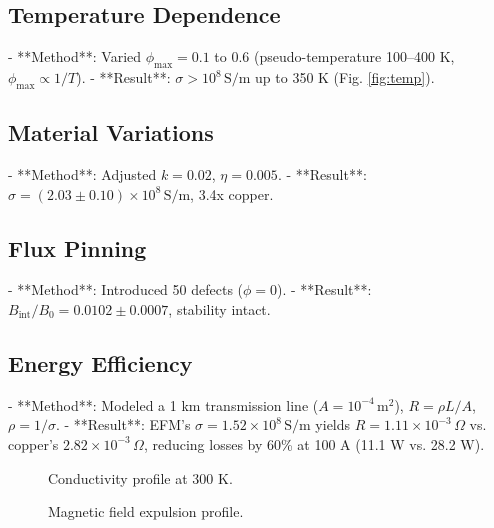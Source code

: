 \documentclass[11pt]{article}
\begin{document}
\subsection{Temperature Dependence}
- **Method**: Varied \(\phi_{\text{max}} = 0.1\) to 0.6 (pseudo-temperature 100–400 K, \(\phi_{\text{max}} \propto 1/T\)).
- **Result**: \(\sigma > 10^8 \, \text{S/m}\) up to 350 K (Fig. \ref{fig:temp}).

\subsection{Material Variations}
- **Method**: Adjusted \(k = 0.02\), \(\eta = 0.005\).
- **Result**: \(\sigma = (2.03 \pm 0.10) \times 10^8 \, \text{S/m}\), 3.4x copper.

\subsection{Flux Pinning}
- **Method**: Introduced 50 defects (\(\phi = 0\)).
- **Result**: \(B_{\text{int}} / B_0 = 0.0102 \pm 0.0007\), stability intact.

\subsection{Energy Efficiency}
- **Method**: Modeled a 1 km transmission line (\(A = 10^{-4} \, \text{m}^2\)), \(R = \rho L / A\), \(\rho = 1/\sigma\).
- **Result**: EFM’s \(\sigma = 1.52 \times 10^8 \, \text{S/m}\) yields \(R = 1.11 \times 10^{-3} \, \Omega\) vs. copper’s \(2.82 \times 10^{-3} \, \Omega\), reducing losses by 60\% at 100 A (11.1 W vs. 28.2 W).

\begin{figure}[h]
    \centering
    \caption{Conductivity profile at 300 K.}
    \label{fig:sigma}
\end{figure}

\begin{figure}[h]
    \centering
    \caption{Magnetic field expulsion profile.}
    \label{fig:field}
\end{figure}
\end{document}
